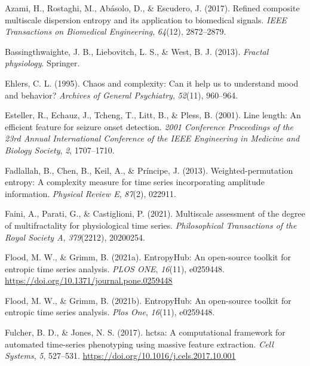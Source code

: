 \documentclass[
  man]{apa6}
\newlength{\cslhangindent}
\newlength{\cslentryspacingunit} %
\newenvironment{CSLReferences}[2] %
 {%
  \setlength{\parindent}{0pt}
  \ifodd #1
  \let\oldpar\par
  \def\par{\hangindent=\cslhangindent\oldpar}
  \fi
  \setlength{\parskip}{#2\cslentryspacingunit}
 }%
 {}
\begin{document}
\hypertarget{refs}{}
\begin{CSLReferences}{1}{0}
\leavevmode{}%
Azami, H., Rostaghi, M., Abásolo, D., \& Escudero, J. (2017). Refined composite multiscale dispersion entropy and its application to biomedical signals. \emph{IEEE Transactions on Biomedical Engineering}, \emph{64}(12), 2872--2879.

\leavevmode{}%
Bassingthwaighte, J. B., Liebovitch, L. S., \& West, B. J. (2013). \emph{Fractal physiology}. Springer.

\leavevmode{}%
Ehlers, C. L. (1995). Chaos and complexity: Can it help us to understand mood and behavior? \emph{Archives of General Psychiatry}, \emph{52}(11), 960--964.

\leavevmode{}%
Esteller, R., Echauz, J., Tcheng, T., Litt, B., \& Pless, B. (2001). Line length: An efficient feature for seizure onset detection. \emph{2001 Conference Proceedings of the 23rd Annual International Conference of the IEEE Engineering in Medicine and Biology Society}, \emph{2}, 1707--1710.

\leavevmode{}%
Fadlallah, B., Chen, B., Keil, A., \& Príncipe, J. (2013). Weighted-permutation entropy: A complexity measure for time series incorporating amplitude information. \emph{Physical Review E}, \emph{87}(2), 022911.

\leavevmode{}%
Faini, A., Parati, G., \& Castiglioni, P. (2021). Multiscale assessment of the degree of multifractality for physiological time series. \emph{Philosophical Transactions of the Royal Society A}, \emph{379}(2212), 20200254.

\leavevmode{}%
Flood, M. W., \& Grimm, B. (2021a). EntropyHub: An open-source toolkit for entropic time series analysis. \emph{PLOS ONE}, \emph{16}(11), e0259448. \url{https://doi.org/10.1371/journal.pone.0259448}

\leavevmode{}%
Flood, M. W., \& Grimm, B. (2021b). EntropyHub: An open-source toolkit for entropic time series analysis. \emph{Plos One}, \emph{16}(11), e0259448.

\leavevmode{}%
Fulcher, B. D., \& Jones, N. S. (2017). hctsa: A computational framework for automated time-series phenotyping using massive feature extraction. \emph{Cell Systems}, \emph{5}, 527--531. \url{https://doi.org/10.1016/j.cels.2017.10.001}


\end{CSLReferences}
\end{document}
